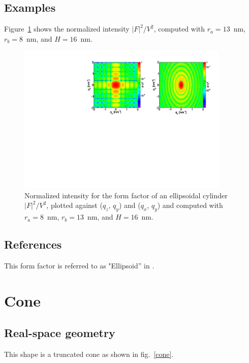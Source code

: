 \subsection{Examples}
Figure~\ref{figFFellipscylinderEx} shows the normalized intensity
$|F|^2/V^2$, computed with $r_a=13$~nm, $r_b=8$~nm, and $H=16$~nm.
\begin{figure}[h]
\begin{center}
\includegraphics[width=0.9\textwidth]{Figures/figffellipscylinder}
\end{center}
\caption{Normalized intensity for the form factor of an ellipsoidal
  cylinder $|F|^2/V^2$, plotted against ($q_z$, $q_y$) and ($q_x$,
  $q_y$) and computed with $r_a=8$~nm, $r_b=13$~nm, and $H=16$~nm.}
\label{figFFellipscylinderEx}
\end{figure}


\subsection{References}
This form factor is referred to as "Ellipsoid'' in . 

\newpage{\cleardoublepage}
\section{Cone}  

\subsection{Real-space geometry}
This shape is a truncated cone as shown in fig.~\ref{cone}. %

